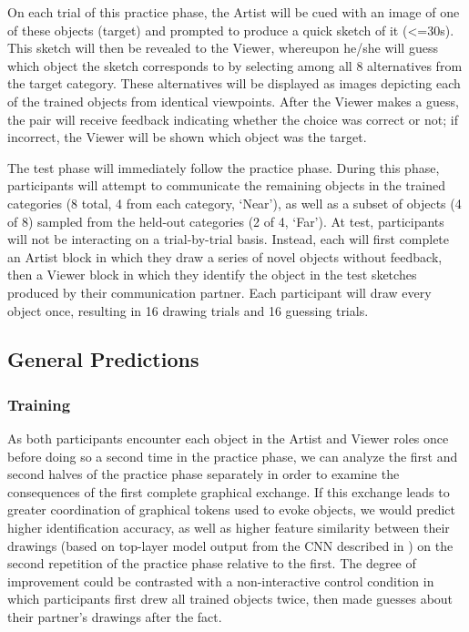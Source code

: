 \documentclass[12pt]{article}
\begin{document}
On each trial of this practice phase, the Artist will be cued with an image of one of these objects (target) and prompted to produce a quick sketch of it (<=30s). This sketch will then be revealed to the Viewer, whereupon he/she will guess which object the sketch corresponds to by selecting among all 8 alternatives from the target category. These alternatives will be displayed as images depicting each of the trained objects from identical viewpoints. After the Viewer makes a guess, the pair will receive feedback indicating whether the choice was correct or not; if incorrect, the Viewer will be shown which object was the target. 

The test phase will immediately follow the practice phase. During this phase, participants will attempt to communicate the remaining objects in the trained categories (8 total, 4 from each category, `Near'), as well as a subset of objects (4 of 8) sampled from the held-out categories (2 of 4, `Far'). At test, participants will not be interacting on a trial-by-trial basis. Instead, each will first complete an Artist block in which they draw a series of novel objects without feedback, then a Viewer block in which they identify the object in the test sketches produced by their communication partner. Each participant will draw every object once, resulting in 16 drawing trials and 16 guessing trials. 

\subsection{General Predictions}

\subsubsection{Training}

As both participants encounter each object in the Artist and Viewer roles once before doing so a second time in the practice phase, we can analyze the first and second halves of the practice phase separately in order to examine the consequences of the first complete graphical exchange. If this exchange leads to greater coordination of graphical tokens used to evoke objects, we would predict higher identification accuracy, as well as higher feature similarity between their drawings (based on top-layer model output from the CNN described in ) on the second repetition of the practice phase relative to the first. The degree of improvement could be contrasted with a non-interactive control condition in which participants first drew all trained objects twice, then made guesses about their partner's drawings after the fact. 
\end{document}
